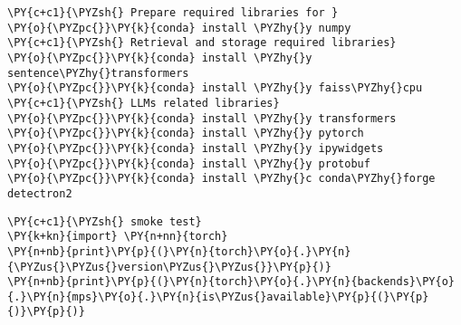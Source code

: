 \documentclass[11pt]{wseas}
\begin{document}
    \begin{tcolorbox}[breakable, size=fbox, boxrule=1pt, pad at break*=1mm,colback=cellbackground, colframe=cellborder]
\begin{Verbatim}[commandchars=\\\{\}]
\PY{c+c1}{\PYZsh{} Prepare required libraries for }
\PY{o}{\PYZpc{}}\PY{k}{conda} install \PYZhy{}y numpy
\PY{c+c1}{\PYZsh{} Retrieval and storage required libraries}
\PY{o}{\PYZpc{}}\PY{k}{conda} install \PYZhy{}y sentence\PYZhy{}transformers
\PY{o}{\PYZpc{}}\PY{k}{conda} install \PYZhy{}y faiss\PYZhy{}cpu
\PY{c+c1}{\PYZsh{} LLMs related libraries}
\PY{o}{\PYZpc{}}\PY{k}{conda} install \PYZhy{}y transformers
\PY{o}{\PYZpc{}}\PY{k}{conda} install \PYZhy{}y pytorch
\PY{o}{\PYZpc{}}\PY{k}{conda} install \PYZhy{}y ipywidgets
\PY{o}{\PYZpc{}}\PY{k}{conda} install \PYZhy{}y protobuf
\PY{o}{\PYZpc{}}\PY{k}{conda} install \PYZhy{}c conda\PYZhy{}forge detectron2
\end{Verbatim}
\end{tcolorbox}

    \begin{tcolorbox}[breakable, size=fbox, boxrule=1pt, pad at break*=1mm,colback=cellbackground, colframe=cellborder]
\begin{Verbatim}[commandchars=\\\{\}]
\PY{c+c1}{\PYZsh{} smoke test}
\PY{k+kn}{import} \PY{n+nn}{torch}
\PY{n+nb}{print}\PY{p}{(}\PY{n}{torch}\PY{o}{.}\PY{n}{\PYZus{}\PYZus{}version\PYZus{}\PYZus{}}\PY{p}{)}
\PY{n+nb}{print}\PY{p}{(}\PY{n}{torch}\PY{o}{.}\PY{n}{backends}\PY{o}{.}\PY{n}{mps}\PY{o}{.}\PY{n}{is\PYZus{}available}\PY{p}{(}\PY{p}{)}\PY{p}{)}
\end{Verbatim}
\end{tcolorbox}
\end{document}
